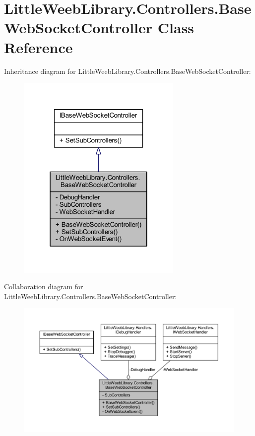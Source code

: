 \hypertarget{class_little_weeb_library_1_1_controllers_1_1_base_web_socket_controller}{}\section{Little\+Weeb\+Library.\+Controllers.\+Base\+Web\+Socket\+Controller Class Reference}
\label{class_little_weeb_library_1_1_controllers_1_1_base_web_socket_controller}


Inheritance diagram for Little\+Weeb\+Library.\+Controllers.\+Base\+Web\+Socket\+Controller\+:\nopagebreak
\begin{figure}[H]
\begin{center}
\leavevmode
\includegraphics[width=226pt]{class_little_weeb_library_1_1_controllers_1_1_base_web_socket_controller__inherit__graph}
\end{center}
\end{figure}


Collaboration diagram for Little\+Weeb\+Library.\+Controllers.\+Base\+Web\+Socket\+Controller\+:\nopagebreak
\begin{figure}[H]
\begin{center}
\leavevmode
\includegraphics[width=350pt]{class_little_weeb_library_1_1_controllers_1_1_base_web_socket_controller__coll__graph}
\end{center}
\end{figure}
